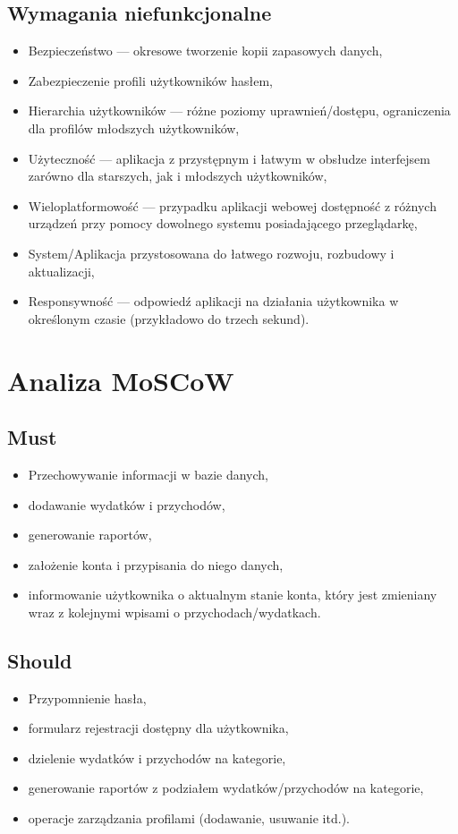 \documentclass[12pt,a4paper,oneside]{article}
\begin{document}
\subsection{Wymagania niefunkcjonalne}
\begin{itemize}
    \item Bezpieczeństwo — okresowe tworzenie kopii zapasowych danych,
    \item Zabezpieczenie profili użytkowników hasłem,
    \item Hierarchia użytkowników — różne poziomy uprawnień/dostępu,
          ograniczenia dla profilów młodszych użytkowników,
    \item Użyteczność — aplikacja z przystępnym i łatwym w obsłudze interfejsem
          zarówno dla starszych, jak i młodszych użytkowników,
    \item Wieloplatformowość — przypadku aplikacji webowej dostępność z różnych
          urządzeń przy pomocy dowolnego systemu posiadającego przeglądarkę,
    \item System/Aplikacja przystosowana do łatwego rozwoju, rozbudowy i
          aktualizacji,
    \item Responsywność — odpowiedź aplikacji na działania użytkownika w
          określonym czasie (przykładowo do trzech sekund).
\end{itemize}

\section{Analiza MoSCoW}
\subsection{Must}
\begin{itemize}
    \item Przechowywanie informacji w bazie danych,
    \item dodawanie wydatków i przychodów,
    \item generowanie raportów,
    \item założenie konta i przypisania do niego danych,
    \item informowanie użytkownika o aktualnym stanie konta, który jest
          zmieniany wraz z kolejnymi wpisami o przychodach/wydatkach.
\end{itemize}

\subsection{Should}
\begin{itemize}
    \item Przypomnienie hasła,
    \item formularz rejestracji dostępny dla użytkownika,
    \item dzielenie wydatków i przychodów na kategorie,
    \item generowanie raportów z podziałem wydatków/przychodów na kategorie,
    \item operacje zarządzania profilami (dodawanie, usuwanie itd.).
\end{itemize}
\end{document}
